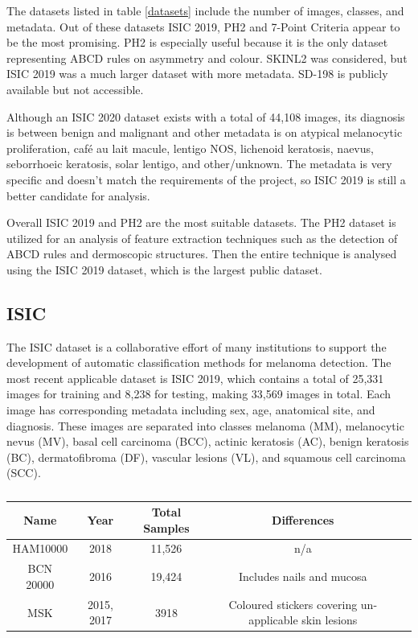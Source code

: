 The datasets listed in table \ref{datasets} include the number of images, classes, and metadata. Out of these datasets ISIC 2019, PH2 and 7-Point Criteria appear to be the most promising. PH2 is especially useful because it is the only dataset representing ABCD rules on asymmetry and colour. SKINL2 was considered, but ISIC 2019 was a much larger dataset with more metadata. SD-198 is publicly available but not accessible.

Although an ISIC 2020 dataset exists with a total of 44,108 images, its diagnosis is between benign and malignant and other metadata is on atypical melanocytic proliferation, café au lait macule, lentigo NOS, lichenoid keratosis, naevus, seborrhoeic keratosis, solar lentigo, and other/unknown. The metadata is very specific and doesn't match the requirements of the project, so ISIC 2019 is still a better candidate for analysis.

Overall ISIC 2019 and PH2 are the most suitable datasets. The PH2 dataset is utilized for an analysis of feature extraction techniques such as the detection of ABCD rules and dermoscopic structures. Then the entire technique is analysed using the ISIC 2019 dataset, which is the largest public dataset.


\subsection{ISIC}
The ISIC dataset is a collaborative effort of many institutions to support the development of automatic classification methods for melanoma detection. The most recent applicable dataset is ISIC 2019, which contains a total of 25,331 images for training and 8,238 for testing, making 33,569 images in total. Each image has corresponding metadata including sex, age, anatomical site, and diagnosis. These images are separated into classes melanoma (MM), melanocytic nevus (MV), basal cell carcinoma (BCC), actinic keratosis (AC), benign keratosis (BC), dermatofibroma (DF), vascular lesions (VL), and squamous cell carcinoma (SCC). 



\begin{table}
	\small
	\begin{tabular}{|c|c|c|c|c|}
		\hline
		Name & Year & Total Samples & Differences \\
		\hline
		HAM10000 & 2018 & 11,526 & n/a
		\\
		\hline
		BCN 20000 & 2016 & 19,424 & Includes nails and mucosa
		\\
		\hline
		MSK & 2015, 2017 & 3918 & Coloured stickers covering un-applicable skin lesions
		\\
		\hline	
	\end{tabular}
	\caption{}
\end{table} \label{ISIC_AF}

